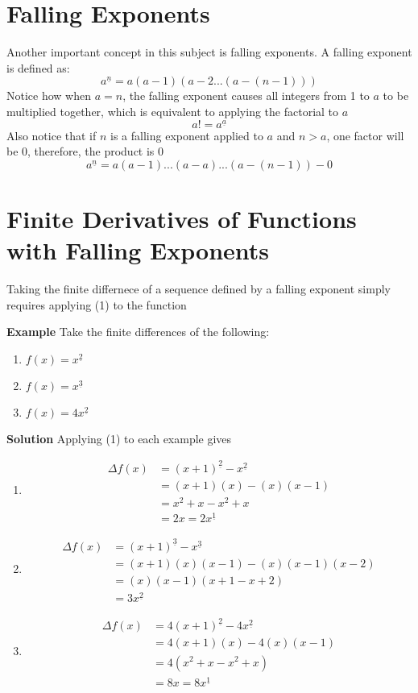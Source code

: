 \section{Falling Exponents}
Another important concept in this subject is falling exponents. A falling exponent is defined as:
\begin{equation}\label{eq:3}
    a^{\underline{n}} = a(a-1)(a-2...(a-(n-1)))
\end{equation}
Notice how when \(a=n\), the falling exponent causes all integers from 1 to \(a\) to be multiplied together, which is equivalent to applying the factorial to \(a\)
\[a! = a^{\underline{a}}\]
Also notice that if \(n\) is a falling exponent applied to \(a\) and \(n>a\), one factor will be 0, therefore, the product is 0
\[a^{\underline{n}} = a(a-1)...(a-a)...(a-(n-1)) - 0\]

\section{Finite Derivatives of Functions with Falling Exponents}
Taking the finite differnece of a sequence defined by a falling exponent simply requires applying (1) to the function

\textbf{Example}
Take the finite differences of the following:
\begin{enumerate}
    \item \(f(x) = x^{\underline{2}}\)
    \item \(f(x) = x^{\underline{3}}\)
    \item \(f(x) = 4x^{\underline{2}}\)
\end{enumerate}

\textbf{Solution}
Applying (1) to each example gives
\begin{enumerate}
    \item \begin{align*}
        \Delta f(x) & = (x+1)^{\underline{2}} - x^{\underline{2}} \\
        & = (x+1)(x) - (x)(x-1) \\
        & = x^2 + x - x^2 + x \\
        & = 2x = 2x^{\underline{1}}
    \end{align*}

    \item \begin{align*}
        \Delta f(x) & = (x+1)^{\underline{3}} - x^{\underline{3}} \\
        & = (x+1)(x)(x-1) - (x)(x-1)(x-2) \\
        & = (x)(x-1)(x+1-x+2) \\
        & = 3x^{\underline{2}} 
    \end{align*}

    \item \begin{align*}
        \Delta f(x) & = 4(x+1)^{\underline{2}} - 4x^{\underline{2}} \\
        & = 4(x+1)(x) - 4(x)(x-1) \\
        & = 4(x^2 + x - x^2 + x) \\
        & = 8x = 8x^{\underline{1}}
    \end{align*}
\end{enumerate}

